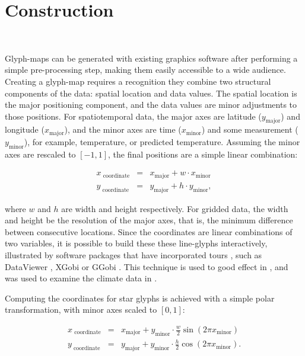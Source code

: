 \documentclass[oneside]{article}
\newcommand\amin{\text{minor}}
\newcommand\amaj{\text{major}}
\begin{document}
\section{Construction}~\label{sec:construction}

Glyph-maps can be generated with existing graphics software after performing a simple pre-processing step, making them easily accessible to a wide audience. Creating a glyph-map requires a recognition they combine two structural components of the data: spatial location and data values. The spatial location is the major positioning component, and the data values are minor adjustments to those positions. For spatiotemporal data, the major axes are latitude ($y_{\amaj}$) and longitude ($x_{\amaj}$), and the minor axes are time ($x_{\amin}$) and some measurement ($y_{\amin}$), for example, temperature, or predicted temperature. Assuming the minor axes are rescaled to $[-1, 1]$, the final positions are a simple linear combination:

\begin{equation}
  \begin{array}{lll}
  x_\text{ coordinate}&=& x_{\amaj} + w \cdot x_{\amin}\\
  y_\text{ coordinate}&=& y_{\amaj} + h \cdot y_{\amin}, 
  \end{array}
  \label{coords.eqn}
\end{equation}

\noindent where $w$ and $h$ are width and height respectively. For gridded data, the width and height be the resolution of the major axes, that is, the minimum difference between consecutive locations. Since the coordinates are linear combinations of two variables, it is possible to build these these line-glyphs interactively, illustrated by software packages that have incorporated tours \citep{cook:2006}, such as DataViewer \citep{buja:1986}, XGobi \citep{swayne:1991} or GGobi \citep{swayne:2003}. This technique is used to good effect in \citet{buja:1996a}, and was used to examine the climate data in \citet{hobbs:2010}.

Computing the coordinates for star glyphs is achieved with a simple polar transformation, with minor axes scaled to $[0, 1]$: 

\begin{equation}
  \begin{array}{lll}
  x_\text{ coordinate}&=& x_{\amaj} + y_{\amin} \cdot \frac{w}{2} \sin(2 \pi x_{\amin}) \\
  y_\text{ coordinate}&=& y_{\amaj} + y_{\amin} \cdot \frac{h}{2} \cos(2 \pi x_{\amin}).
  \end{array}
  \label{coords.polar.eqn}
\end{equation}
\end{document}
